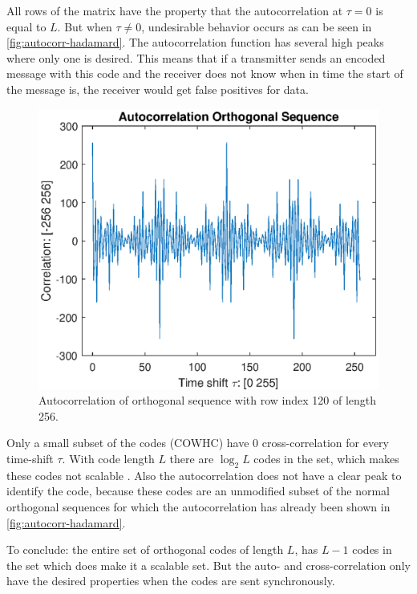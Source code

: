 All rows of the matrix have the property that the autocorrelation at $\tau = 0$ is equal to $L$.
But when $\tau \neq 0$, undesirable behavior occurs as can be seen in \autoref{fig:autocorr-hadamard}.
The autocorrelation function has several high peaks where only one is desired.
This means that if a transmitter sends an encoded message with this code and the receiver does not know when in time the start of the message is, the receiver would get false positives for data.

\begin{figure}[t]
	\centering
	\includegraphics[width=\textwidth]{chapters/cdma-chapters/autocorr-hadamard.eps}
	\caption{Autocorrelation of orthogonal sequence with row index 120 of length 256.}
	\label{fig:autocorr-hadamard}
\end{figure}



Only a small subset of the codes (COWHC) have $0$ cross-correlation for every time-shift $\tau$.
With code length $L$ there are $\log_2 L$ codes in the set, which makes these codes not scalable \cite{1182447}. 
Also the autocorrelation does not have a clear peak to identify the code, because these codes are an unmodified subset of the normal orthogonal sequences for which the autocorrelation has already been shown in \autoref{fig:autocorr-hadamard}.

To conclude: the entire set of orthogonal codes of length $L$, has $L - 1$ codes in the set which does make it a scalable set.
But the auto- and cross-correlation only have the desired properties when the codes are sent synchronously. 
